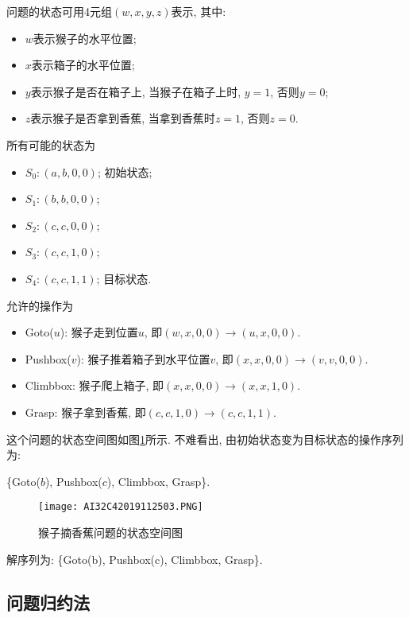 \begin{result}
问题的状态可用4元组$(w, x, y, z)$表示, 其中:
\begin{itemize}
    \item $w$表示猴子的水平位置;
    \item $x$表示箱子的水平位置;
    \item $y$表示猴子是否在箱子上, 当猴子在箱子上时, $y=1$, 否则$y=0$;
    \item $z$表示猴子是否拿到香蕉, 当拿到香蕉时$z=1$, 否则$z=0$.
\end{itemize}
所有可能的状态为
\begin{itemize}
    \item $S_0: (a, b, 0, 0)$;    初始状态;
    \item $S_1: (b, b, 0, 0)$;
    \item $S_2: (c, c, 0, 0)$;
    \item $S_3: (c, c, 1, 0)$;
    \item $S_4: (c, c, 1, 1)$;    目标状态.
\end{itemize}
允许的操作为
\begin{itemize}
    \item Goto($u$): 猴子走到位置$u$, 即$(w, x, 0, 0) \rightarrow (u, x, 0, 0)$.
    \item Pushbox($v$): 猴子推着箱子到水平位置$v$, 即$(x, x, 0, 0) \rightarrow (v, v, 0, 0)$.
    \item Climbbox: 猴子爬上箱子, 即$(x, x, 0, 0) \rightarrow (x, x, 1, 0)$.
    \item Grasp: 猴子拿到香蕉, 即$(c, c, 1, 0 ) \rightarrow (c, c, 1, 1)$.
\end{itemize}
这个问题的状态空间图如图\ref{AI32fig2019120224}所示. 不难看出, 由初始状态变为目标状态的操作序列为:
\begin{center}
  \{Goto($b$), Pushbox($c$), Climbbox, Grasp\}.
\end{center}
\begin{figure}[H]
\centering
\texttt{[image: AI32C42019112503.PNG]}
\caption{猴子摘香蕉问题的状态空间图}
\label{AI32fig2019120224}
\end{figure}
解序列为: \{Goto(b), Pushbox(c), Climbbox, Grasp\}.
\end{result}
\subsection{问题归约法}
